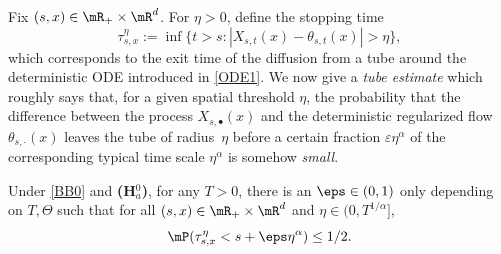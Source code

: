 Fix $(s,x)\in\mR_+\times\mR^d$. For $\eta>0$, define the stopping time
\begin{equation}\label{DH1}
\tau^\eta_{s,x}:=\inf\bigl\{t>s: |X_{s,t}(x)-\theta_{s,t}(x)|>\eta\bigr\},
\end{equation}
which corresponds to the exit time of the diffusion from a tube around the deterministic ODE introduced in \eqref{ODE1}.
We now give a \textit{tube estimate} which roughly says that, for a given spatial threshold $\eta$, the probability that the difference between the process $X_{s,{\scriptscriptstyle\bullet}}(x)$ and the deterministic regularized flow $\theta_{s,\cdot}(x) $ leaves the tube of radius~$\eta $ before a certain fraction $\varepsilon \eta^\alpha $ of the corresponding typical time scale $\eta^\alpha $ is somehow \textit{small}.
\begin{lemma}\label{Le23}
Under \eqref{BB0} and {\bf (H$^0_a$)}, for any $T>0$,
there is an $\eps\in(0,1)$ only depending on $T,\Theta$ such that
for all $(s,x)\in\mR_+\times\mR^d$ and $\eta\in(0,T^{1/\alpha}]$,
\[
\mP(\tau^\eta_{s,x}<s+\eps\eta^\alpha)\leq 1/2.
\]
\end{lemma}
